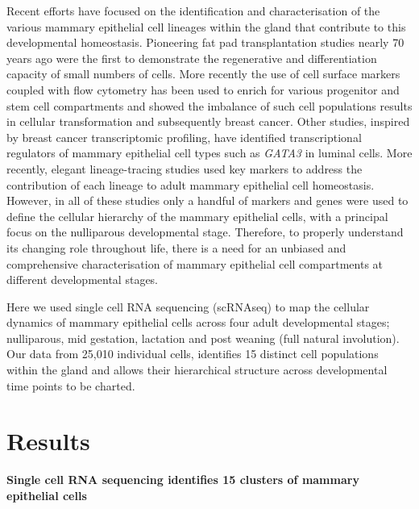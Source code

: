 \documentclass[titlepage, 12pt, oneside]{amsart}
\begin{document}
Recent efforts have focused on the identification and characterisation of the various mammary epithelial cell lineages within the gland that contribute to this developmental homeostasis.
Pioneering fat pad transplantation studies nearly 70 years ago were the first to demonstrate the regenerative and differentiation capacity of small numbers of cells\autocite{Faulkin1960,Daniel197,Smalley1998}.
More recently the use of cell surface markers coupled with flow cytometry has been used to enrich for various progenitor and stem cell compartments\autocite{Smalley1998,Stingl2006,Shackleton2006,Asselin2007} and showed the imbalance of such cell populations results in cellular transformation and subsequently breast cancer\autocite{Lim2009,Molyneux2010}.
Other studies, inspired by breast cancer transcriptomic profiling, have identified transcriptional regulators of mammary epithelial cell types such as \textit{GATA3} in luminal cells\autocite{Asselin2007,Kouros2006}.
More recently, elegant lineage-tracing studies used key markers to address the contribution of each lineage to adult mammary epithelial cell homeostasis\autocite{Inman2015}.
However, in all of these studies only a handful of markers and genes were used to define the cellular hierarchy of the mammary epithelial cells, with a principal focus on the nulliparous developmental stage.
Therefore, to properly understand its changing role throughout life, there is a need for an unbiased and comprehensive characterisation of mammary epithelial cell compartments at different developmental stages.

Here we used single cell RNA sequencing (scRNAseq) to map the cellular dynamics of mammary epithelial cells across four adult developmental stages; nulliparous, mid gestation, lactation and post weaning (full natural involution).
Our data from 25,010 individual cells, identifies 15 distinct cell populations within the gland and allows their hierarchical structure across developmental time points to be charted.

\section{Results}

\textbf{Single cell RNA sequencing identifies 15 clusters of mammary epithelial cells}
\end{document}

